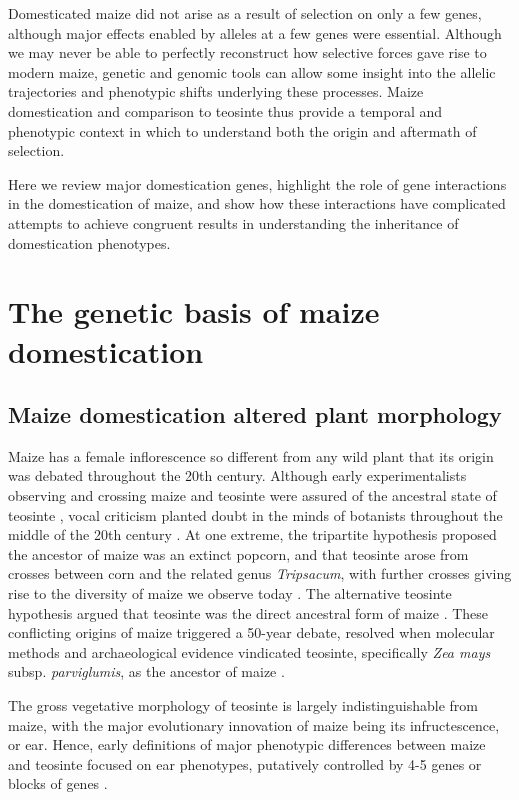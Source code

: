 \documentclass[9pt,twocolumn,twoside]{rilabRxiv}
\begin{document}
Domesticated maize did not arise as a result of selection on only a few genes, although major effects enabled by alleles at a few genes were essential.
Although we may never be able to perfectly reconstruct how selective forces gave rise to modern maize, genetic and genomic tools can allow some insight into the allelic trajectories and phenotypic shifts underlying these processes.
Maize domestication and comparison to teosinte thus provide a temporal and phenotypic context in which to understand both the origin and aftermath of selection.

Here we review major domestication genes, highlight the role of gene interactions in the domestication of maize, and show how these interactions have complicated attempts to achieve congruent results in understanding the inheritance of domestication phenotypes.

\section*{The genetic basis of maize domestication}

\subsection*{Maize domestication altered plant morphology}

Maize has a female inflorescence so different from any wild plant that its origin was debated throughout the 20th century.
Although early experimentalists observing and crossing maize and teosinte were assured of the ancestral state of teosinte \citep{harshberger1896, collins1920, weatherwax1924}, vocal criticism planted doubt in the minds of botanists throughout the middle of the 20th century \citep{mangelsdorf1939, mangelsdorf1974}.
At one extreme, the tripartite hypothesis proposed the ancestor of maize was an extinct popcorn, and that teosinte arose from crosses between corn and the related genus \textit{Tripsacum}, with further crosses giving rise to the diversity of maize we observe today \citep{mangelsdorf1939}.
The alternative teosinte hypothesis argued that teosinte was the direct ancestral form of maize \citep{beadle1939}.
These conflicting origins of maize triggered a 50-year debate, resolved when molecular methods and archaeological evidence vindicated teosinte, specifically \textit{Zea mays} subsp. \textit{parviglumis}, as the ancestor of maize \citep{matsuoka2002, piperno2009, bennetzen2001}.

The gross vegetative morphology of teosinte is largely indistinguishable from maize, with the major evolutionary innovation of maize being its infructescence, or ear.
Hence, early definitions of major phenotypic differences between maize and teosinte focused on ear phenotypes, putatively controlled by 4-5 genes or blocks of genes \citep{beadle1939, mangelsdorf1939}.
\end{document}

